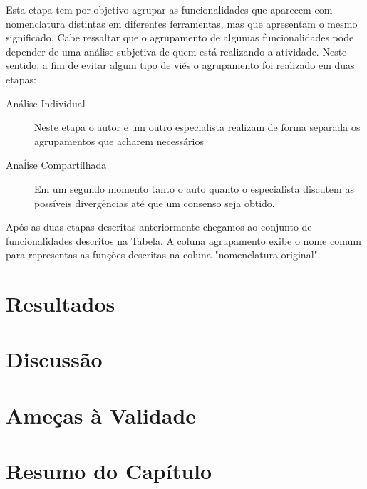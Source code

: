 Esta etapa tem por objetivo agrupar as funcionalidades que aparecem com
nomenclatura distintas em diferentes ferramentas, mas que apresentam o mesmo
significado. Cabe ressaltar que o agrupamento de algumas funcionalidades pode
depender de uma análise subjetiva de quem está realizando a atividade.  Neste
sentido, a fim de evitar algum tipo de viés o agrupamento foi realizado em duas
etapas:

\begin{description}
	\item[Análise Individual] Neste etapa o autor e um outro especialista
		realizam de forma separada os agrupamentos que acharem necessários
	\item[Anaĺise Compartilhada] Em um segundo momento tanto o auto quanto o
		especialista discutem as possíveis divergências até que um consenso seja
		obtido.	\end{description}

Após as duas etapas descritas anteriormente chegamos ao conjunto de
funcionalidades descritos na Tabela. A coluna agrupamento exibe o nome comum
para representas as funções descritas na coluna "nomenclatura original"


\section{Resultados}
\label{sec:resultados}



\section{Discussão}
\label{sec:discussao}

\section{Ameças à Validade}
\label{sec:ameacas_a_validade}


\section{Resumo do Capítulo}
\label{sec:resumo_do_capitulo}
